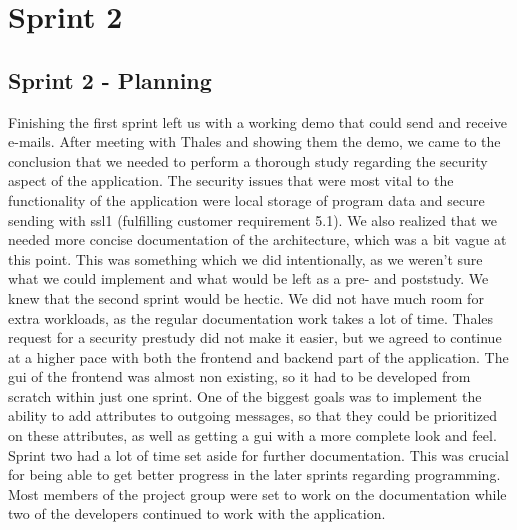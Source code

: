 \chapter{Sprint 2}

\section{Sprint 2 - Planning}
Finishing the first sprint left us with a working demo that could send and receive e-mails. After meeting with Thales and showing them the demo, we came to the conclusion that we needed to perform a thorough study regarding the security aspect of the application. The security issues that were most vital to the functionality of the application were local storage of program data and secure sending with \gls{ssl1} (fulfilling customer requirement 5.1). We also realized that we needed more concise documentation of the architecture, which was a bit vague at this point. This was something which we did intentionally, as we weren’t sure what we could implement and what would be left as a pre- and poststudy. 
\newline
\newline
We knew that the second sprint would be hectic. We did not have much room for extra workloads, as the regular documentation work takes a lot of time. Thales request for a security prestudy did not make it easier, but we agreed to continue at a higher pace with both the frontend and backend part of the application. The \gls{gui} of the frontend was almost non existing, so it had to be developed from scratch within just one sprint. One of the biggest goals was to implement the ability to add attributes to outgoing messages, so that they could be prioritized on these attributes, as well as getting a \gls{gui} with a more complete look and feel.
\newline
\newline
Sprint two had a lot of time set aside for further documentation. This was crucial for being able to get better progress in the later sprints regarding programming. Most members of the project group were set to work on the documentation while two of the developers continued to work with the application. 